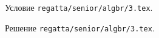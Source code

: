 \problem
Условие \texttt{regatta/senior/algbr/3.tex}.

\solution Решение \texttt{regatta/senior/algbr/3.tex}.
\endproblem
